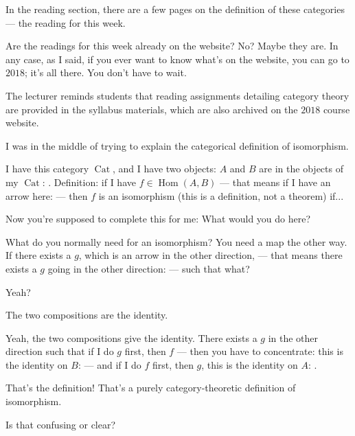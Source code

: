 \begin{speech}[01:19:18 - 01:20:08]
In the reading section, there are a few pages on the definition of these categories --- the reading for this week.

Are the readings for this week already on the website? No? Maybe they are. In any case, as I said, if you ever want to know what's on the website, you can go to $2018$; it's all there. You don't have to wait.
\end{speech}

\begin{note}
The lecturer reminds students that reading assignments detailing category theory are provided in the syllabus materials, which are also archived on the $2018$ course website.
\end{note}

\begin{speech}[01:20:08 - 01:21:17]
I was in the middle of trying to explain the categorical definition of isomorphism.

I have this category $\operatorname{Cat}$,  and I have two objects: $A$ and $B$ are in the objects of my $\operatorname{Cat}$: . Definition:  if I have $f \in \operatorname{Hom}(A, B)$ --- that means if I have an arrow here:  --- then $f$ is an isomorphism (this is a definition, not a theorem)  if... 

Now you're supposed to complete this for me: What would you do here?

What do you normally need for an isomorphism? You need a map the other way. If there exists a $g$, which is an arrow in the other direction,  --- that means there exists a $g$ going in the other direction:  --- such that what?

Yeah?
\end{speech}

\begin{student}
The two compositions are the identity.
\end{student}

\begin{speech}[01:21:21 - 01:21:46]
Yeah, the two compositions give the identity. There exists a $g$ in the other direction such that  if I do $g$ first, then $f$ --- then you have to concentrate: this is the identity on $B$:  --- and if I do $f$ first, then $g$, this is the identity on $A$: .

That's the definition! That's a purely category-theoretic definition of isomorphism.

Is that confusing or clear?
\end{speech}

